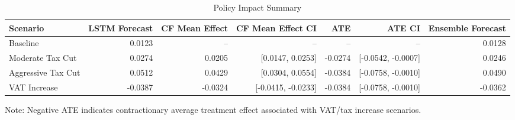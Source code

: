 \begin{table}[htbp]
  \centering
  \caption{Policy Impact Summary}
  \label{tab:table3_policy_impact_summary}
  \small
  \begin{tabular}{lrrrrrr}
    \toprule
    Scenario & LSTM Forecast & CF Mean Effect & CF Mean Effect CI & ATE & ATE CI & Ensemble Forecast \\
    \midrule
    Baseline & 0.0123 & -- & -- & -- & -- & 0.0128 \\
    Moderate Tax Cut & 0.0274 & 0.0205 & [0.0147, 0.0253] & -0.0274 & [-0.0542, -0.0007] & 0.0246 \\
    Aggressive Tax Cut & 0.0512 & 0.0429 & [0.0304, 0.0554] & -0.0384 & [-0.0758, -0.0010] & 0.0490 \\
    VAT Increase & -0.0387 & -0.0324 & [-0.0415, -0.0233] & -0.0384 & [-0.0758, -0.0010] & -0.0362 \\
    \bottomrule
  \end{tabular}
  \vspace{0.5em}
  {\footnotesize Note: Negative ATE indicates contractionary average treatment effect associated with VAT/tax increase scenarios.}
\end{table}
